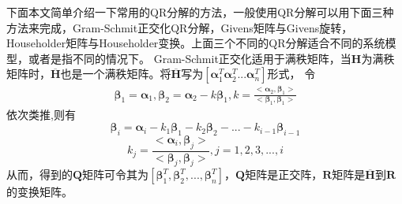 \documentclass[bachelor,nocolorlinks, printoneside]{seuthesis} %
\begin{document}
\begin{Main}
下面本文简单介绍一下常用的QR分解的方法，一般使用QR分解可以用下面三种方法来完成，Gram-Schmit正交化QR分解，Givens矩阵与Givens旋转，Householder矩阵与Householder变换。上面三个不同的QR分解适合不同的系统模型，或者是指不同的情况下。
Gram-Schmit正交化适用于满秩矩阵，当$\mathbf{H}$为满秩矩阵时，$\overline{\mathbf{H}}$也是一个满秩矩阵。将$\overline{\mathbf{H}}$写为$[\bm{\alpha}_1^T \bm{\alpha}_2^T ... \bm{\alpha}_n^T]$形式，
令
\begin{eqnarray}\label{key}
\bm{\beta}_1 = \bm{\alpha}_1 , \bm{\beta}_2 = \bm{\alpha}_2 - k\bm{\beta}_1 , k = \frac{<\bm{\alpha}_2,\bm{\beta}_1>}{<\bm{\beta}_1,\bm{\beta}_1>} \nonumber
\end{eqnarray}
依次类推,则有
\begin{equation}\label{key}
\bm{\beta}_i = \bm{\alpha}_i - k_1\bm{\beta}_1 -k_2\bm{\beta}_2 - ... - k_{i-1}\bm{\beta}_{i-1} \nonumber
\end{equation}
\begin{equation}\label{key}
k_j = \frac{<\bm{\alpha}_i,\bm{\beta}_j>}{<\bm{\beta}_j,\bm{\beta}_j>}, j= 1,2,3,...,i \nonumber
\end{equation}
从而，得到的$\mathbf{Q}$矩阵可令其为$[\bm{\beta}_1^T,\bm{\beta}_2^T,...,\bm{\beta}_n^T]$，$\mathbf{Q}$矩阵是正交阵，$\mathbf{R}$矩阵是$\overline{\mathbf{H}}$到$\mathbf{R}$的变换矩阵。\\


\end{Main}
\end{document}
